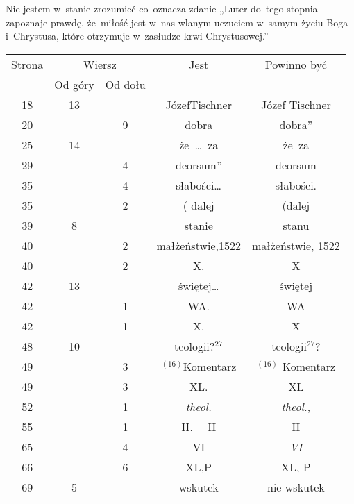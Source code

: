 \documentclass[a4paper,11pt]{article}
\begin{document}
\noindent
{} Nie jestem w~stanie zrozumieć co~oznacza zdanie
„Luter do~tego stopnia zapoznaje prawdę, że~miłość jest w~nas wlanym
uczuciem w~samym życiu Boga i~Chrystusa, które otrzymuje w~zasłudze
krwi Chrystusowej.”

\vspace{\spaceFour}





\newpage



\begin{center}

  \begin{tabular}{|c|c|c|c|c|}
    \hline
    Strona & \multicolumn{2}{c|}{Wiersz} & Jest
                              & Powinno być \\ \cline{2-3}
    & Od góry & Od dołu & & \\
    \hline
    18  & 13 & & JózefTischner & Józef Tischner \\
    20  & &  9 & dobra & dobra” \\
        25  & 14 & & że~\ldots~za & że~za \\
    29  & &  4 & deorsum” & deorsum \\
    35  & &  4 & słabości\ldots & słabości. \\
    35  & &  2 & ( dalej & (dalej \\
    39  &  8 & & stanie & stanu \\
    40  & &  2 & małżeństwie,1522 & małżeństwie, 1522 \\
    40  & &  2 & X. & X \\
    42  & 13 & & świętej\ldots & świętej \\
    42  & &  1 & WA. & WA \\
    42  & &  1 & X. & X \\
    48  & 10 & & teologii?$^{ 27 }$ & teologii$^{ 27 }$? \\
    49  & &  3 & $^{ ( 16 ) }$Komentarz & $^{ ( 16 ) }$ Komentarz \\
    49  & &  3 & XL. & XL \\
    52  & &  1 & \textit{theol.} & \textit{theol.}, \\
    55  & &  1 & II. --~II & II \\
    65  & &  4 & VI & \textit{VI} \\
    66  & &  6 & XL,P & XL, P \\
    69  &  5 & & wskutek & nie wskutek \\

\end{tabular}
\end{center}
\end{document}
